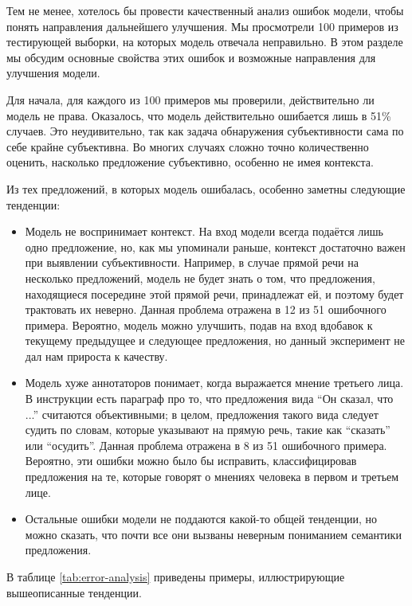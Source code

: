 \documentclass[a4paper,14pt]{extarticle}
\begin{document}
    Тем не менее, хотелось бы провести качественный анализ ошибок модели, чтобы понять направления дальнейшего улучшения. Мы просмотрели 100 примеров из тестирующей выборки, на которых модель отвечала неправильно. В этом разделе мы обсудим основные свойства этих ошибок и возможные направления для улучшения модели.
    
    Для начала, для каждого из 100 примеров мы проверили, действительно ли модель не права. Оказалось, что модель действительно ошибается лишь в 51\% случаев. Это неудивительно, так как задача обнаружения субъективности сама по себе крайне субъективна. Во многих случаях сложно точно количественно оценить, насколько предложение субъективно, особенно не имея контекста.
    
    Из тех предложений, в которых модель ошибалась, особенно заметны следующие тенденции:
    \begin{itemize}
        \item Модель не воспринимает контекст. На вход модели всегда подаётся лишь одно предложение, но, как мы упоминали раньше, контекст достаточно важен при выявлении субъективности. Например, в случае прямой речи на несколько предложений, модель не будет знать о том, что предложения, находящиеся посередине этой прямой речи, принадлежат ей, и поэтому будет трактовать их неверно. Данная проблема отражена в 12 из 51 ошибочного примера. Вероятно, модель можно улучшить, подав на вход вдобавок к текущему предыдущее и следующее предложения, но данный эксперимент не дал нам прироста к качеству.
        \item Модель хуже аннотаторов понимает, когда выражается мнение третьего лица. В инструкции есть параграф про то, что предложения вида ``Он сказал, что ...'' считаются объективными; в целом, предложения такого вида следует судить по словам, которые указывают на прямую речь, такие как ``сказать'' или ``осудить''. Данная проблема отражена в 8 из 51 ошибочного примера. Вероятно, эти ошибки можно было бы исправить, классифицировав предложения на те, которые говорят о мнениях человека в первом и третьем лице.
        \item Остальные ошибки модели не поддаются какой-то общей тенденции, но можно сказать, что почти все они вызваны неверным пониманием семантики предложения. 
    \end{itemize}
    В таблице \ref{tab:error-analysis} приведены примеры, иллюстрирующие вышеописанные тенденции.
\end{document}
